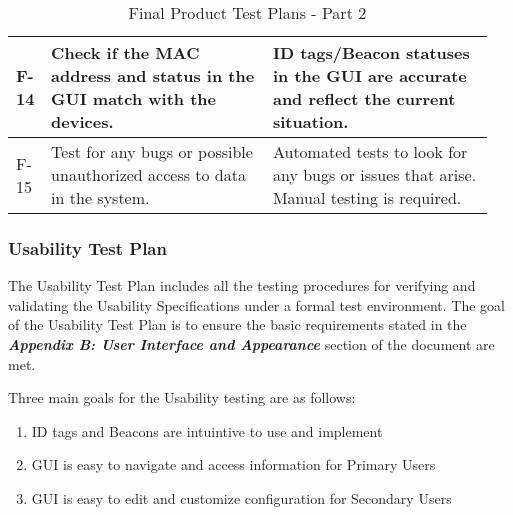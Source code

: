 \begin{table}[h!]
\begin{tabular}{|m{0.05\linewidth}|m{0.45\linewidth}|m{0.45\linewidth}|}
    F-14
    & Check if the MAC address and status in the GUI match with the devices.
    & ID tags/Beacon statuses in the GUI are accurate and reflect the current situation.  \\ 
    \hline

    F-15
    & Test for any bugs or possible unauthorized access to data in the system.
    & Automated tests to look for any bugs or issues that arise. Manual testing is required.  \\ 
    \hline


\end{tabular}
	\caption{Final Product Test Plans - Part 2}
\end{table}



\pagebreak
\subsubsection{Usability Test Plan}

The Usability Test Plan includes all the testing procedures for verifying and validating the Usability Specifications under a 
formal test environment. The goal of the Usability Test Plan is to ensure the basic requirements stated in the 
\textbf{\textit{Appendix B: User Interface and Appearance}} section of the document are met.

\medskip
Three main goals for the Usability testing are as follows:
\begin{enumerate}
    \item ID tags and Beacons are intuintive to use and implement
    \item GUI is easy to navigate and access information for Primary Users
    \item GUI is easy to edit and customize configuration for Secondary Users
\end{enumerate} 

